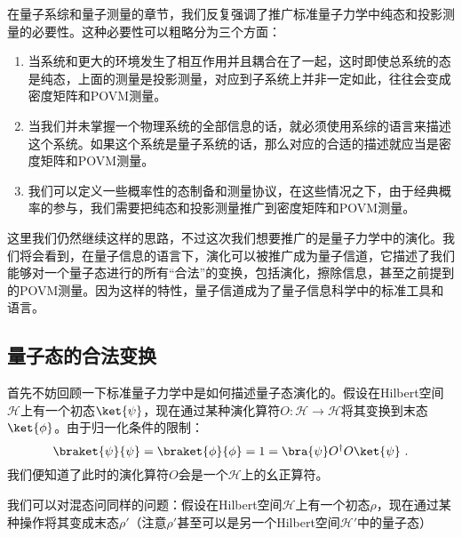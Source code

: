 
\begin{issues}
\issueDraft
\end{issues}


在量子系综和量子测量的章节，我们反复强调了推广标准量子力学中纯态和投影测量的必要性。这种必要性可以粗略分为三个方面：
\begin{enumerate}
\item 当系统和更大的环境发生了相互作用并且耦合在了一起，这时即使总系统的态是纯态，上面的测量是投影测量，对应到子系统上并非一定如此，往往会变成密度矩阵和POVM测量。
\item 当我们并未掌握一个物理系统的全部信息的话，就必须使用系综的语言来描述这个系统。如果这个系统是量子系统的话，那么对应的合适的描述就应当是密度矩阵和POVM测量。
\item 我们可以定义一些概率性的态制备和测量协议，在这些情况之下，由于经典概率的参与，我们需要把纯态和投影测量推广到密度矩阵和POVM测量。
\end{enumerate}

这里我们仍然继续这样的思路，不过这次我们想要推广的是量子力学中的演化。我们将会看到，在量子信息的语言下，演化可以被推广成为量子信道，它描述了我们能够对一个量子态进行的所有“合法”的变换，包括演化，擦除信息，甚至之前提到的POVM测量。因为这样的特性，量子信道成为了量子信息科学中的标准工具和语言。

\subsection{量子态的合法变换}

首先不妨回顾一下标准量子力学中是如何描述量子态演化的。假设在Hilbert空间$\mathcal{H}$上有一个初态$\ket{\psi}$，现在通过某种演化算符$O:\mathcal{H}\to\mathcal{H}$将其变换到末态$\ket{\phi}$。由于归一化条件的限制：
\begin{equation}
\braket{\psi}{\psi}=\braket{\phi}{\phi}=1=\bra{\psi}O^\dagger O\ket{\psi}~.
\end{equation}
我们便知道了此时的演化算符$O$会是一个$\mathcal{H}$上的幺正算符。

我们可以对混态问同样的问题：假设在Hilbert空间$\mathcal{H}$上有一个初态$\rho$，现在通过某种操作将其变成末态$\rho'$（注意$\rho'$甚至可以是另一个Hilbert空间$\mathcal{H}'$中的量子态）
